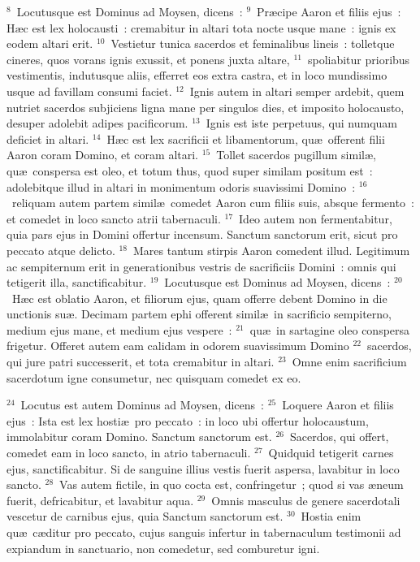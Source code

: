 ${}^{8}$~Locutusque est Dominus ad Moysen, dicens~:
${}^{9}$~Pr\ae cipe Aaron et filiis ejus~: H\ae c est lex holocausti~: cremabitur in altari tota nocte usque mane~: ignis ex eodem altari erit.
${}^{10}$~Vestietur tunica sacerdos et feminalibus lineis~: tolletque cineres, quos vorans ignis exussit, et ponens juxta altare,
${}^{11}$~spoliabitur prioribus vestimentis, indutusque aliis, efferret eos extra castra, et in loco mundissimo usque ad favillam consumi faciet.
${}^{12}$~Ignis autem in altari semper ardebit, quem nutriet sacerdos subjiciens ligna mane per singulos dies, et imposito holocausto, desuper adolebit adipes pacificorum.
${}^{13}$~Ignis est iste perpetuus, qui numquam deficiet in altari.
${}^{14}$~H\ae c est lex sacrificii et libamentorum, qu\ae\ offerent filii Aaron coram Domino, et coram altari.
${}^{15}$~Tollet sacerdos pugillum simil\ae , qu\ae\ conspersa est oleo, et totum thus, quod super similam positum est~: adolebitque illud in altari in monimentum odoris suavissimi Domino~:
${}^{16}$~reliquam autem partem simil\ae\ comedet Aaron cum filiis suis, absque fermento~: et comedet in loco sancto atrii tabernaculi.
${}^{17}$~Ideo autem non fermentabitur, quia pars ejus in Domini offertur incensum. Sanctum sanctorum erit, sicut pro peccato atque delicto.
${}^{18}$~Mares tantum stirpis Aaron comedent illud. Legitimum ac sempiternum erit in generationibus vestris de sacrificiis Domini~: omnis qui tetigerit illa, sanctificabitur.
${}^{19}$~Locutusque est Dominus ad Moysen, dicens~:
${}^{20}$~H\ae c est oblatio Aaron, et filiorum ejus, quam offerre debent Domino in die unctionis su\ae . Decimam partem ephi offerent simil\ae\ in sacrificio sempiterno, medium ejus mane, et medium ejus vespere~:
${}^{21}$~qu\ae\ in sartagine oleo conspersa frigetur. Offeret autem eam calidam in odorem suavissimum Domino
${}^{22}$~sacerdos, qui jure patri successerit, et tota cremabitur in altari.
${}^{23}$~Omne enim sacrificium sacerdotum igne consumetur, nec quisquam comedet ex eo.


${}^{24}$~Locutus est autem Dominus ad Moysen, dicens~:
${}^{25}$~Loquere Aaron et filiis ejus~: Ista est lex hosti\ae\ pro peccato~: in loco ubi offertur holocaustum, immolabitur coram Domino. Sanctum sanctorum est.
${}^{26}$~Sacerdos, qui offert, comedet eam in loco sancto, in atrio tabernaculi.
${}^{27}$~Quidquid tetigerit carnes ejus, sanctificabitur. Si de sanguine illius vestis fuerit aspersa, lavabitur in loco sancto.
${}^{28}$~Vas autem fictile, in quo cocta est, confringetur~; quod si vas \ae neum fuerit, defricabitur, et lavabitur aqua.
${}^{29}$~Omnis masculus de genere sacerdotali vescetur de carnibus ejus, quia Sanctum sanctorum est.
${}^{30}$~Hostia enim qu\ae\ c\ae ditur pro peccato, cujus sanguis infertur in tabernaculum testimonii ad expiandum in sanctuario, non comedetur, sed comburetur igni.


